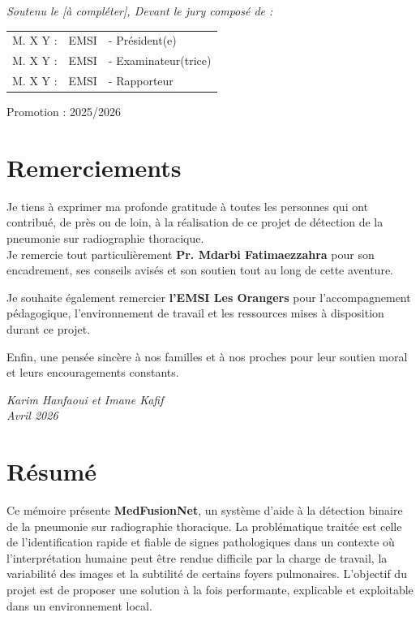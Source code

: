 \documentclass[a4paper,11pt,oneside]{report}
\begin{document}
\begin{titlepage}
{\large \textit{Soutenu le [à compléter], Devant le jury composé de : }}\\[0.5cm]

\centering
\begin{tabular}{lll}
\large M. X Y : & \large EMSI & \large - Président(e) \\[0.1cm]
\large M. X Y : & \large EMSI & \large - Examinateur(trice) \\[0.1cm]
\large M. X Y : & \large EMSI & \large - Rapporteur
\end{tabular}

\vspace{20mm}
{\large Promotion : 2025/2026}
\end{titlepage}

\chapter*{Remerciements}
\thispagestyle{empty}

\vspace{1cm}

Je tiens à exprimer ma profonde gratitude à toutes les personnes qui ont contribué, de près ou de loin, à la réalisation de ce projet de détection de la pneumonie sur radiographie thoracique.\\[0.5cm]

Je remercie tout particulièrement \textbf{Pr. Mdarbi Fatimaezzahra} pour son encadrement, ses conseils avisés et son soutien tout au long de cette aventure.

Je souhaite également remercier \textbf{l'EMSI Les Orangers} pour l'accompagnement pédagogique, l'environnement de travail et les ressources mises à disposition durant ce projet.

Enfin, une pensée sincère à nos familles et à nos proches pour leur soutien moral et leurs encouragements constants.

\vfill

\begin{flushright}
    \textit{Karim Hanfaoui et Imane Kafif}\\
    \textit{Avril 2026}
\end{flushright}

\clearpage
\tableofcontents
\clearpage
\listoftables
\clearpage
\listoffigures
\clearpage

\chapter*{Résumé}
Ce mémoire présente \textbf{MedFusionNet}, un système d’aide à la détection binaire de la pneumonie sur radiographie thoracique. La problématique traitée est celle de l’identification rapide et fiable de signes pathologiques dans un contexte où l’interprétation humaine peut être rendue difficile par la charge de travail, la variabilité des images et la subtilité de certains foyers pulmonaires. L’objectif du projet est de proposer une solution à la fois performante, explicable et exploitable dans un environnement local.
\end{document}
